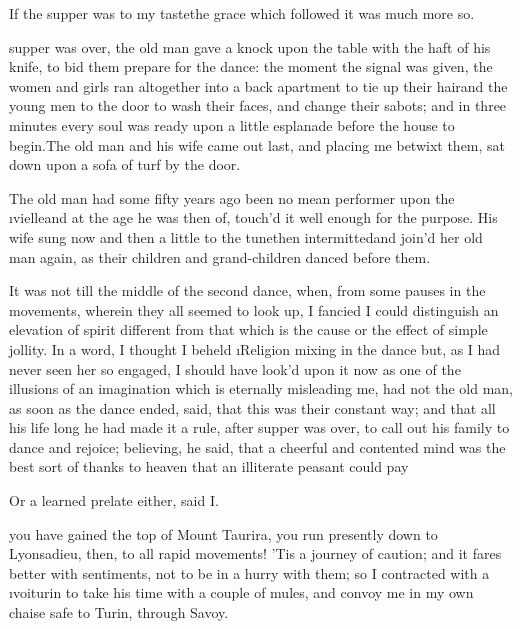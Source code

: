 \documentclass[twoside]{article}
\begin{document}
If the supper was to my taste\tskk the
grace which followed it was much more so.





\vskip 6pt


 supper was over, the old
man gave a knock upon the table with the
haft of his knife, to bid them prepare for
the dance: the moment the signal was
given, the women and girls ran altogether
into a back apartment to tie up their
hair\tskk and the young men to the door
to wash their faces, and change their
sabots; and in three minutes every soul
was ready upon a little esplanade before
the house to begin.\tskk The old man and
his wife came out last, and placing me
betwixt them, sat down upon a sofa of turf
by the door.

The old man had some fifty years ago been
no mean performer upon the
\i{vielle}\tskk and at the age he was
then of, touch’d it well enough for the
purpose.  His wife sung now and then a
little to the tune\tskk then
intermitted\tskk and join’d her old man
again, as their children and
grand-children danced before them.

It was not till the middle of the second
dance, when, from some pauses in the
movements, wherein they all seemed to look
up, I fancied I could distinguish an
elevation of spirit different from that
which is the cause or the effect of simple
jollity.  In a word, I thought I beheld
\i{Religion} mixing in the dance\tskk
but, as I had never seen her so engaged, I
should have look’d upon it now as one of
the illusions of an imagination which is
eternally misleading me, had not the old
man, as soon as the dance ended, said,
that this was their constant way; and that
all his life long he had made it a rule,
after supper was over, to call out his
family to dance and rejoice; believing, he
said, that a cheerful and contented mind
was the best sort of thanks to heaven that
an illiterate peasant could pay\tskk 

Or a learned prelate either, said I.





\vskip 6pt


 you have gained the top
of Mount Taurira, you run presently down
to Lyons\tskk adieu, then, to all rapid
movements!  ’Tis a journey of caution; and
it fares better with sentiments, not to be
in a hurry with them; so I contracted with
a \i{voiturin} to take his time with a
couple of mules, and convoy me in my own
chaise safe to Turin, through Savoy.
\end{document}

